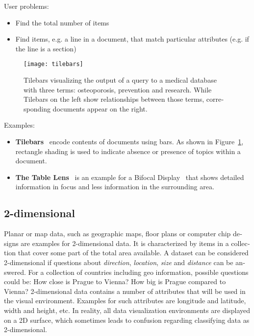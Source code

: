\begin{english}
\SuperPar User problems:

\begin{itemize}
\item Find the total number of items
\item Find items, e.g. a line in a document, that match particular attributes (e.g. if the line is a section)
\end{itemize}


\begin{figure}
\centering
\texttt{[image: tilebars]}
\caption{Tilebars visualizing the output of a query to a medical database with three terms: osteoporosis, prevention and research. While Tilebars on the left show relationships between those terms, corresponding documents appear on the right.}
\label{fig:tilebars}
\end{figure}

\SuperPar Examples:

\begin{itemize}
\item \textbf{Tilebars}~\cite{Hearst95tilebars} encode contents of documents using bars. As shown in Figure~\ref{fig:tilebars}, rectangle shading is used to indicate absence or presence of topics within a document.
\item \textbf{The Table Lens}~\cite{tablelens97} is an example for a Bifocal Display~\cite{Spence82} that shows detailed information in focus and less information in the surrounding area.
\end{itemize}


\subsection{2-dimensional}

Planar or map data, such as geographic maps, floor plans or computer chip designs are examples for 2-dimensional data. It is characterized by items in a collection that cover some part of the total area available. A dataset can be considered 2-dimensional if questions about \emph{direction}, \emph{location}, \emph{size} and \emph{distance} can be answered. For a collection of countries including geo information, possible questions could be: How close is Prague to Vienna? How big is Prague compared to Vienna? 2-dimensional data contains a number of attributes that will be used in the visual environment. Examples for such attributes are longitude and latitude, width and height, etc. In reality, all data visualization environments are displayed on a 2D surface, which sometimes leads to confusion regarding classifying data as 2-dimensional.


\end{english}
